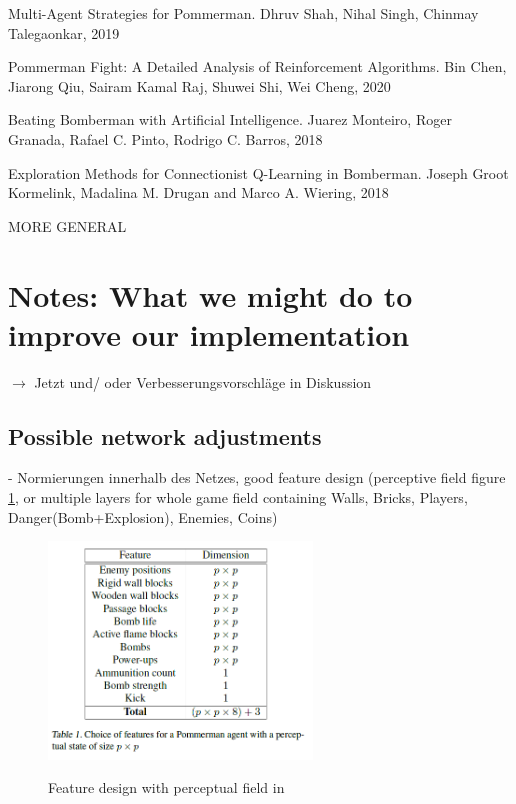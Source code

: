 \documentclass[a4paper ,12pt]{report}
\begin{document}
	Multi-Agent Strategies for Pommerman. Dhruv Shah, Nihal Singh, Chinmay Talegaonkar, 2019 \cite{Pommerman}
	
	Pommerman Fight: A Detailed Analysis of Reinforcement Algorithms. Bin Chen, Jiarong Qiu, Sairam Kamal Raj, Shuwei Shi, Wei Cheng, 2020 \cite{PommAnalysis}
	
	Beating Bomberman with Artificial Intelligence. Juarez Monteiro, Roger Granada, Rafael C. Pinto, Rodrigo C. Barros, 2018 \cite{BeatBomberman2018}
	
	Exploration Methods for Connectionist Q-Learning in Bomberman. Joseph Groot Kormelink, Madalina M. Drugan and Marco A. Wiering, 2018 \cite{ExploreConnectionistQLearning}
	
	MORE GENERAL
	
	\cite{DeepQNet}
	
	\newpage
	
	\section*{Notes: What we might do to improve our implementation}
	$\rightarrow$ Jetzt und/ oder Verbesserungsvorschläge in Diskussion
	
	\subsection*{Possible network adjustments}
	
	- Normierungen innerhalb des Netzes, good feature design (perceptive field figure \ref{fig:feat1}, or multiple layers for whole game field containing Walls, Bricks, Players, Danger(Bomb+Explosion), Enemies, Coins)
	
	\begin{figure}[ht]
		\caption{Feature design with perceptual field in \cite{Pommerman}}
		\includegraphics[width=7cm]{features_with_perceptual_field.png}
		\label{fig:feat1}
	\end{figure}
	
\end{document}

